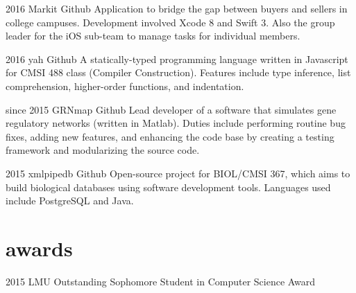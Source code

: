 \documentclass[]{friggeri-cv} %
\begin{document}
  \begin{entrylist}

    \entry
      {2016}
      {Markit}
      {Github}
      {Application to bridge the gap between buyers and sellers in college campuses. Development involved Xcode 8 and Swift 3. Also the group leader for the iOS sub-team to manage tasks for individual members.}

    
    \entry
      {2016}
      {yah}
      {Github}
      {A statically-typed programming language written in Javascript for CMSI 488 class (Compiler Construction). Features include type inference, list comprehension, higher-order functions, and indentation.}


    \entry
      {since 2015}
      {GRNmap}
      {Github}
      {Lead developer of a software that simulates gene regulatory networks (written in Matlab). Duties include performing routine bug fixes, adding new features, and enhancing the code base by creating a testing framework and modularizing the source code.}


    \entry
      {2015}
      {xmlpipedb}
      {Github}
      {Open-source project for BIOL/CMSI 367, which aims to build biological databases using software development tools. Languages used include PostgreSQL and Java.}

  
  \end{entrylist}


\section{awards}

  \begin{entrylist}
  

    \shortentry
      {2015}
      {LMU Outstanding Sophomore Student in Computer Science Award}
      
            
  \end{entrylist}
\end{document}
